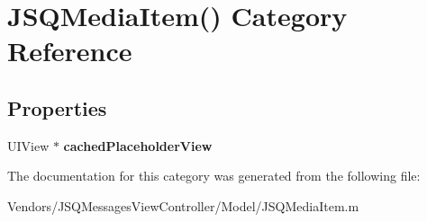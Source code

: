 \hypertarget{category_j_s_q_media_item_07_08}{}\section{J\+S\+Q\+Media\+Item() Category Reference}
\label{category_j_s_q_media_item_07_08}
\subsection*{Properties}
\begin{DoxyCompactItemize}
\item 
\hypertarget{category_j_s_q_media_item_07_08_a3ad378b29db2f0aa8208a7327b575749}{}U\+I\+View $\ast$ {\bfseries cached\+Placeholder\+View}\label{category_j_s_q_media_item_07_08_a3ad378b29db2f0aa8208a7327b575749}

\end{DoxyCompactItemize}


The documentation for this category was generated from the following file\+:\begin{DoxyCompactItemize}
\item 
Vendors/\+J\+S\+Q\+Messages\+View\+Controller/\+Model/J\+S\+Q\+Media\+Item.\+m\end{DoxyCompactItemize}
